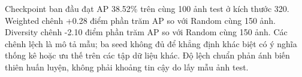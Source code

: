 Checkpoint ban đầu đạt AP 38.52\% trên cùng 100 ảnh test ở kích thước 320. Weighted chênh +0.28 điểm phần trăm AP so với Random cùng 150 ảnh. Diversity chênh -2.10 điểm phần trăm AP so với Random cùng 150 ảnh. Các chênh lệch là mô tả mẫu; ba seed không đủ để khẳng định khác biệt có ý nghĩa thống kê hoặc ưu thế trên các tập dữ liệu khác. Độ lệch chuẩn phản ánh biến thiên huấn luyện, không phải khoảng tin cậy do lấy mẫu ảnh test.
